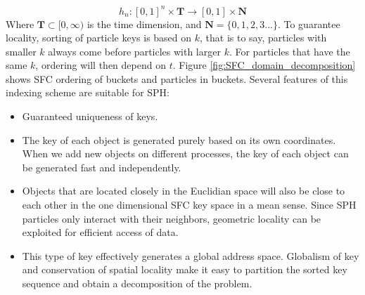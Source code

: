 \documentclass[procedia]{easychair}
\begin{document}
\begin{equation}
h_n: [0,1]^n \times \textbf{T} \rightarrow [0,1] \times \textbf{N}
\end{equation}
Where $\textbf{T} \subset [0,\infty)$ is the time dimension, and $\textbf{N}=\lbrace 0, 1, 2, 3...\rbrace$.
To guarantee locality, sorting of particle keys is based on $k$, that is to say, particles with smaller $k$ always come before particles with larger $k$. For particles that have the same $k$, ordering will then depend on $t$. Figure \ref{fig:SFC_domain_decomposition} shows SFC ordering of buckets and particles in buckets. 
Several features of this indexing scheme are suitable for SPH:
\begin{itemize}
\item Guaranteed uniqueness of keys.
\item The key of each object is generated purely based on its own coordinates. When we add new objects on different processes, the key of each object can be generated fast and independently.
\item Objects that are located closely in the Euclidian space will also be close to each other in the one dimensional SFC key space in a mean sense. Since SPH particles only interact with their neighbors, geometric locality can be exploited for efficient access of data.
\item This type of key effectively generates a global address space. Globalism of key and conservation of spatial locality make it easy to partition the sorted key sequence and obtain a decomposition of the problem.
\end{itemize}
\end{document}
